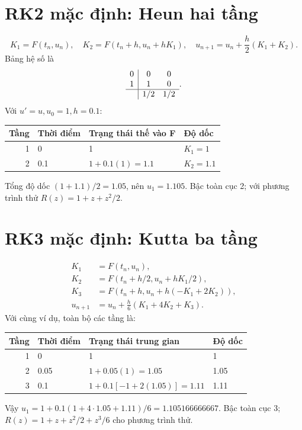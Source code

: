 \section{RK2 mặc định: Heun hai tầng}
\label{sec:ode-rk2}
\[
K_1=F(t_n,u_n),\quad K_2=F(t_n+h,u_n+hK_1),
\quad u_{n+1}=u_n+\frac h2(K_1+K_2).
\]
Bảng hệ số là
\[
\begin{array}{c|cc}0&0&0\\1&1&0\\\hline&1/2&1/2\end{array}.
\]
Với $u'=u,u_0=1,h=0.1$:
\begin{center}\begin{tabular}{rlll}
\toprule Tầng&Thời điểm&Trạng thái thế vào F&Độ dốc\\\midrule
1&0&1&$K_1=1$\\
2&0.1&$1+0.1(1)=1.1$&$K_2=1.1$\\\bottomrule
\end{tabular}\end{center}
Tổng độ dốc $(1+1.1)/2=1.05$, nên $u_1=1.105$. Bậc toàn cục 2; với phương trình thử $R(z)=1+z+z^2/2$.

\section{RK3 mặc định: Kutta ba tầng}
\label{sec:ode-rk3}
\begin{align*}
K_1&=F(t_n,u_n),\\
K_2&=F(t_n+h/2,u_n+hK_1/2),\\
K_3&=F(t_n+h,u_n+h(-K_1+2K_2)),\\
u_{n+1}&=u_n+\frac h6(K_1+4K_2+K_3).
\end{align*}
Với cùng ví dụ, toàn bộ các tầng là:
\begin{center}\begin{tabular}{rlll}
\toprule Tầng&Thời điểm&Trạng thái trung gian&Độ dốc\\\midrule
1&0&1&1\\
2&0.05&$1+0.05(1)=1.05$&1.05\\
3&0.1&$1+0.1[-1+2(1.05)]=1.11$&1.11\\\bottomrule
\end{tabular}\end{center}
Vậy $u_1=1+0.1(1+4\cdot1.05+1.11)/6=1.105166666667$. Bậc toàn cục 3; $R(z)=1+z+z^2/2+z^3/6$ cho phương trình thử.

